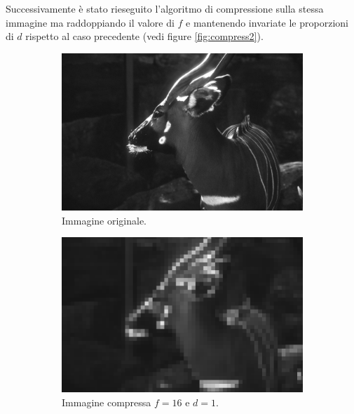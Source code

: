 Successivamente è stato rieseguito l'algoritmo di compressione sulla stessa immagine 
ma raddoppiando il valore di $f$ e mantenendo invariate le proporzioni di $d$ rispetto 
al caso precedente (vedi figure \ref{fig:compress2}). 

\begin{figure}[!ht]
    \centering
    \begin{subfigure}[!ht]{0.45\textwidth}
        \includegraphics[width=\textwidth]{Progetto_2/img/gui.png}
        \caption{Immagine originale.}
    \end{subfigure}
    \begin{subfigure}[!ht]{0.45\textwidth}
        \includegraphics[width=\textwidth]{Progetto_2/img/f16d1.png}
        \caption{Immagine compressa $f = 16$ e $d = 1$.}
    \end{subfigure}
    \begin{subfigure}[!ht]{0.45\textwidth}

\end{subfigure}
\end{figure}
